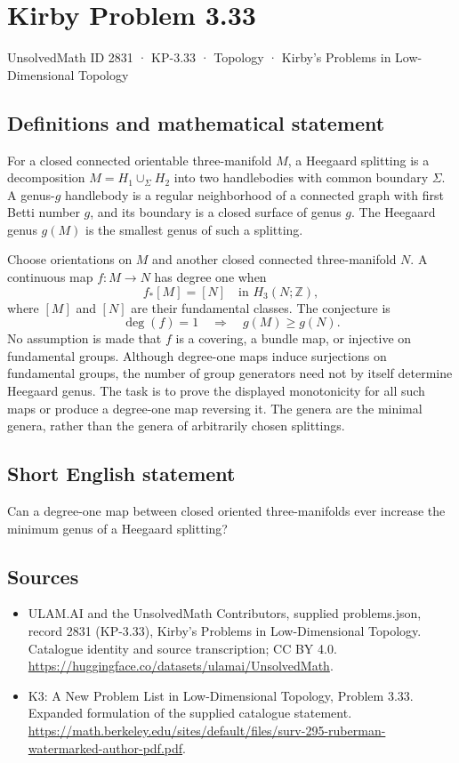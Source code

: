 \documentclass[11pt,a4paper]{article}
\begin{document}
\section*{Kirby Problem 3.33}\label{2831}
{\small UnsolvedMath ID 2831 · KP-3.33 · Topology · Kirby's Problems in Low-Dimensional Topology}
\subsection{Definitions and mathematical statement}
For a closed connected orientable three-manifold $M$, a Heegaard splitting
is a decomposition $M=H_1\cup_\Sigma H_2$ into two handlebodies with common
boundary $\Sigma$. A genus-$g$ handlebody is a regular neighborhood of a
connected graph with first Betti number $g$, and its boundary is a closed
surface of genus $g$. The Heegaard genus $g(M)$ is the smallest genus of
such a splitting.

Choose orientations on $M$ and another closed connected three-manifold $N$.
A continuous map $f:M\to N$ has degree one when
\[
 f_*[M]=[N]\quad\text{in }H_3(N;\mathbb Z),
\]
where $[M]$ and $[N]$ are their fundamental classes. The conjecture is
\[
 \deg(f)=1\quad\Longrightarrow\quad g(M)\geq g(N).
\]
No assumption is made that $f$ is a covering, a bundle map, or injective on
fundamental groups. Although degree-one maps induce surjections on
fundamental groups, the number of group generators need not by itself
determine Heegaard genus. The task is to prove the displayed monotonicity
for all such maps or produce a degree-one map reversing it. The genera are
the minimal genera, rather than the genera of arbitrarily chosen splittings.
\subsection{Short English statement}
Can a degree-one map between closed oriented three-manifolds ever increase the minimum genus of a Heegaard splitting?
\subsection{Sources}
\begin{itemize}
\item[S1] ULAM.AI and the UnsolvedMath Contributors, supplied problems.json, record 2831 (KP-3.33), Kirby's Problems in Low-Dimensional Topology. Catalogue identity and source transcription; CC BY 4.0.
\url{https://huggingface.co/datasets/ulamai/UnsolvedMath}.
\item[S2] K3: A New Problem List in Low-Dimensional Topology, Problem 3.33. Expanded formulation of the supplied catalogue statement.
\url{https://math.berkeley.edu/sites/default/files/surv-295-ruberman-watermarked-author-pdf.pdf}.
\end{itemize}
\end{document}
